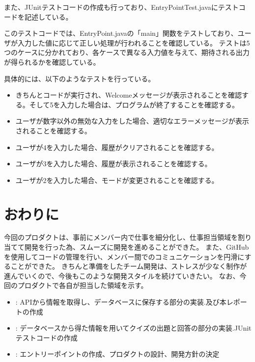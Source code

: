 \documentclass[uplatex,dvipdfmx,a4paper]{jsarticle}
\begin{document}
\par また、JUnitテストコードの作成も行っており、EntryPointTest.javaにテストコードを記述している。

\par このテストコードでは、EntryPoint.javaの「main」関数をテストしており、ユーザが入力した値に応じて正しい処理が行われることを確認している。
テストは5つのケースに分かれており、各ケースで異なる入力値を与えて、期待される出力が得られるかを確認している。
\par 具体的には、以下のようなテストを行っている。
\begin{itemize}
  \item きちんとコードが実行され、Welcomeメッセージが表示されることを確認する。そして5を入力した場合は、プログラムが終了することを確認する。
  \item ユーザが数字以外の無効な入力をした場合、適切なエラーメッセージが表示されることを確認する。
  \item ユーザが4を入力した場合、履歴がクリアされることを確認する。
  \item ユーザが3を入力した場合、履歴が表示されることを確認する。
  \item ユーザが2を入力した場合、モードが変更されることを確認する。
\end{itemize}







\section{おわりに}
今回のプロダクトは、事前にメンバー内で仕事を細分化し、仕事担当領域を割り当てて開発を行った為、スムーズに開発を進めることができた。
また、GitHubを使用してコードの管理を行い、メンバー間でのコミュニケーションを円滑にすることができた。
きちんと準備をしたチーム開発は、ストレスが少なく制作が進んでいくので、今後もこのような開発スタイルを続けていきたい。
なお、今回のプロダクトで各自が担当した領域を示す。
\begin{itemize}
  \item : APIから情報を取得し、データベースに保存する部分の実装.及び本レポートの作成
  \item : データベースから得た情報を用いてクイズの出題と回答の部分の実装.JUnitテストコードの作成
  \item : エントリーポイントの作成、プロダクトの設計、開発方針の決定
\end{itemize}
\end{document}
